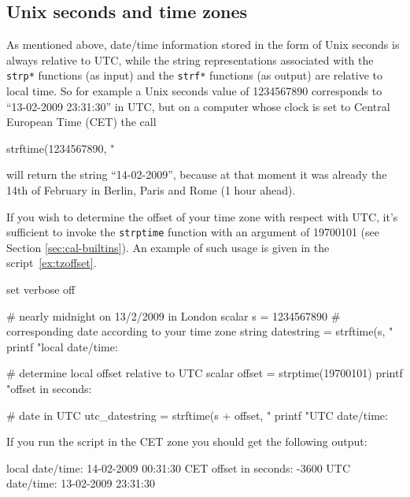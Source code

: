 \subsection{Unix seconds and time zones}

As mentioned above, date/time information stored in the form of Unix
seconds is always relative to UTC, while the string representations
associated with the \texttt{strp*} functions (as input) and the
\texttt{strf*} functions (as output) are relative to local time. So
for example a Unix seconds value of 1234567890 corresponds to
``13-02-2009 23:31:30'' in UTC, but on a computer whose clock is set
to Central European Time (CET) the call
\begin{code}
  strftime(1234567890, "%
\end{code}
will return the string ``14-02-2009'', because at that moment it was
already the 14th of February in Berlin, Paris and Rome (1 hour ahead).

If you wish to determine the offset of your time zone with respect
with UTC, it's sufficient to invoke the \texttt{strptime} function
with an argument of 19700101 (see Section \ref{sec:cal-builtins}).  An
example of such usage is given in the script~\ref{ex:tzoffset}.

\begin{script}[htbp]
  \label{ex:tzoffset}
\begin{scodebit}
set verbose off

# nearly midnight on 13/2/2009 in London
scalar s = 1234567890
# corresponding date according to your time zone
string datestring = strftime(s, "%
printf "local date/time: %

# determine local offset relative to UTC
scalar offset = strptime(19700101)
printf "offset in seconds: %

# date in UTC
utc_datestring = strftime(s + offset, "%
printf "UTC date/time: %
\end{scodebit}
%
If you run the script in the CET zone you should get the following
output:
\begin{outbit}
local date/time: 14-02-2009 00:31:30 CET
offset in seconds: -3600
UTC date/time: 13-02-2009 23:31:30
\end{outbit}
\end{script}

